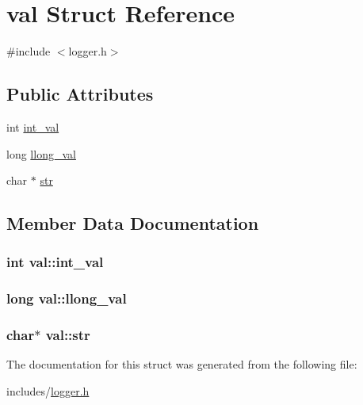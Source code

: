 \hypertarget{structval}{\section{val Struct Reference}
\label{structval}
}


{\ttfamily \#include $<$logger.\-h$>$}

\subsection*{Public Attributes}
\begin{DoxyCompactItemize}
\item 
int \hyperlink{structval_afa7f75220c3e4d6c03cb795cf4eb0def}{int\-\_\-val}
\item 
long \hyperlink{structval_a28519535eeb30b959e1c366cd4a5ae55}{llong\-\_\-val}
\item 
char $\ast$ \hyperlink{structval_a09c4e31207ec081758a8008b694fba33}{str}
\end{DoxyCompactItemize}


\subsection{Member Data Documentation}
\hypertarget{structval_afa7f75220c3e4d6c03cb795cf4eb0def}{
\subsubsection[{int\-\_\-val}]{\setlength{\rightskip}{0pt plus 5cm}int val\-::int\-\_\-val}}\label{structval_afa7f75220c3e4d6c03cb795cf4eb0def}
\hypertarget{structval_a28519535eeb30b959e1c366cd4a5ae55}{
\subsubsection[{llong\-\_\-val}]{\setlength{\rightskip}{0pt plus 5cm}long val\-::llong\-\_\-val}}\label{structval_a28519535eeb30b959e1c366cd4a5ae55}
\hypertarget{structval_a09c4e31207ec081758a8008b694fba33}{
\subsubsection[{str}]{\setlength{\rightskip}{0pt plus 5cm}char$\ast$ val\-::str}}\label{structval_a09c4e31207ec081758a8008b694fba33}


The documentation for this struct was generated from the following file\-:\begin{DoxyCompactItemize}
\item 
includes/\hyperlink{logger_8h}{logger.\-h}\end{DoxyCompactItemize}
